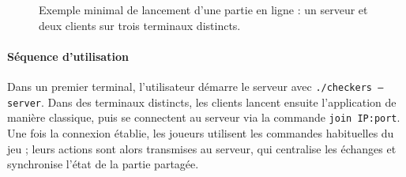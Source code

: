\documentclass[a4paper]{article}
\begin{document}
\begin{figure}[h]
    \centering
    \caption{Exemple minimal de lancement d'une partie en ligne : un serveur et deux clients sur trois terminaux distincts.}
    \label{fig:lancement-online}
\end{figure}

\FloatBarrier

\paragraph{Séquence d'utilisation}
Dans un premier terminal, l'utilisateur démarre le serveur avec
\texttt{./checkers ---server}. Dans des terminaux distincts, les clients lancent
ensuite l'application de manière classique, puis se connectent au serveur via
la commande \texttt{join IP:port}. Une fois la connexion établie, les joueurs
utilisent les commandes habituelles du jeu ; leurs actions sont alors
transmises au serveur, qui centralise les échanges et synchronise l'état de la
partie partagée.
    
\end{document}
